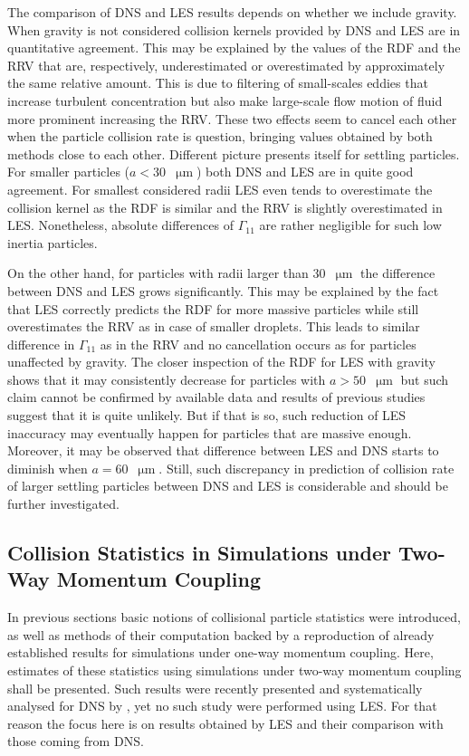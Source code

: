 \documentclass{pracamgren}
\begin{document}
The comparison of DNS and LES results depends on whether we include gravity.
When gravity is not considered collision kernels provided by DNS and LES are in quantitative agreement.
This may be explained by the values of the RDF and the RRV that are, respectively, underestimated or overestimated by approximately the same relative amount.
This is due to filtering of small-scales eddies that increase turbulent concentration but also make large-scale flow motion of fluid more prominent increasing the RRV.
These two effects seem to cancel each other when the particle collision rate is question, bringing values obtained by both methods close to each other.
Different picture presents itself for settling particles.
For smaller particles (${a < 30}$~$\upmu\text{m}$) both DNS and LES are in quite good agreement.
For smallest considered radii LES even tends to overestimate the collision kernel as the RDF is similar and the RRV is slightly overestimated in LES.
Nonetheless, absolute differences of $\Gamma_{11}$ are rather negligible for such low inertia particles.

On the other hand, for particles with radii larger than $30$~$\upmu\text{m}$ the difference between DNS and LES grows significantly.
This may be explained by the fact that LES correctly predicts the RDF for more massive particles while still overestimates the RRV as in case of smaller droplets.
This leads to similar difference in $\Gamma_{11}$ as in the RRV and no cancellation occurs as for particles unaffected by gravity.
The closer inspection of the RDF for LES with gravity shows that it may consistently decrease for particles with $a > 50$~$\upmu\text{m}$ but such claim cannot be confirmed by available data and results of previous studies \parencite{Rosa2017} suggest that it is quite unlikely.
But if that is so, such reduction of LES inaccuracy may eventually happen for particles that are massive enough.
Moreover, it may be observed that difference between LES and DNS starts to diminish when ${a = 60}$~$\upmu\text{m}$.
Still, such discrepancy in prediction of collision rate of larger settling particles between DNS and LES is considerable and should be further investigated.



\subsection{Collision Statistics in Simulations under Two-Way Momentum Coupling}
\label{ssc:ch2.coll.twc}

In previous sections basic notions of collisional particle statistics were introduced, as well as methods of their computation backed by a reproduction of already established results for simulations under one-way momentum coupling.
Here, estimates of these statistics using simulations under two-way momentum coupling shall be presented.
Such results were recently presented and systematically analysed for DNS by \textcite{Rosa2020,Rosa2022}, yet no such study were performed using LES.
For that reason the focus here is on results obtained by LES and their comparison with those coming from DNS.
\end{document}
